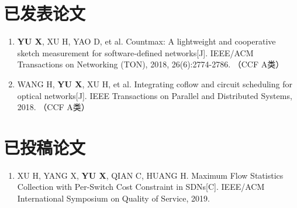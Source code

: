 
\begin{publications}

\section*{已发表论文}

\begin{enumerate}
\item \textbf{YU X}, XU H, YAO D, et al. Countmax: A lightweight and cooperative sketch measurement for software-defined networks[J]. IEEE/ACM Transactions on Networking (TON), 2018, 26(6):2774-2786. （CCF A类）
\item WANG H, \textbf{YU X}, XU H, et al. Integrating coflow and circuit scheduling for optical networks[J]. IEEE Transactions on Parallel and Distributed Systems, 2018. （CCF A类）
\end{enumerate}

\section*{已投稿论文}

\begin{enumerate}
\item XU H, YANG X, \textbf{YU X}, QIAN C, HUANG H. Maximum Flow Statistics Collection with Per-Switch Cost Constraint in SDNs[C]. IEEE/ACM International Symposium on Quality of Service, 2019.
\end{enumerate}
\end{publications}
